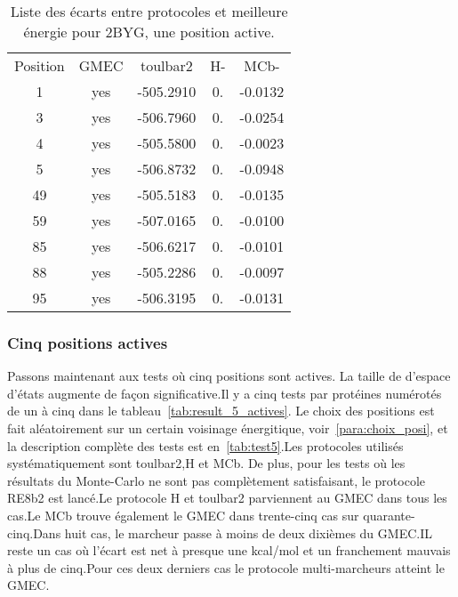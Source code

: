     \begin{table}[h]
      \centering

      \begin{tabular}{ccccc}

        \toprule
        Position & GMEC & toulbar2 & H- & MCb- \\
        \cmidrule{1-5}
        1  & yes &  -505.2910 & 0. & -0.0132 \\
        3  & yes &  -506.7960 & 0. & -0.0254 \\
        4  & yes &  -505.5800 & 0. & -0.0023 \\
        5  & yes &  -506.8732 & 0. & -0.0948 \\
        49 & yes &  -505.5183 & 0. & -0.0135 \\
        59 & yes &  -507.0165 & 0. & -0.0100 \\
        85 & yes &  -506.6217 & 0. & -0.0101 \\
        88 & yes &  -505.2286 & 0. & -0.0097 \\
        95 & yes &  -506.3195 & 0. & -0.0131 \\
        \bottomrule
      \end{tabular}      
      \caption{Liste des écarts entre protocoles et meilleure énergie pour 2BYG, une position active.}
\label{tab:result_1_active_2BYG}
    \end{table}


   \subsubsection{Cinq positions actives}
Passons maintenant aux tests où cinq positions sont actives. La taille de d'espace d'états augmente de façon significative.Il y a cinq tests par protéines numérotés de un à cinq dans le tableau~\ref{tab:result_5_actives}. Le choix des positions est fait aléatoirement sur un certain voisinage énergitique, voir~\ref{para:choix_posi}, et la description complète des tests est en~\ref{tab:test5}.Les protocoles utilisés systématiquement sont toulbar2,H et MCb. De plus, pour les tests où les résultats du Monte-Carlo ne sont pas complètement satisfaisant, le protocole RE8b2 est lancé.Le protocole H et toulbar2 parviennent au GMEC dans tous les cas.Le MCb trouve également le GMEC dans trente-cinq cas sur quarante-cinq.Dans huit cas, le marcheur passe à moins de deux dixièmes du GMEC.IL reste un cas où l'écart est net à presque une kcal/mol et un franchement mauvais à plus de cinq.Pour ces deux derniers cas le protocole multi-marcheurs atteint le GMEC.

